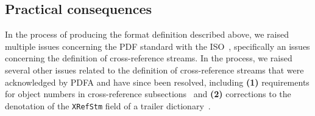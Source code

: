 \subsection{Practical consequences}
\label{sec:consequences}
%
In the process of producing the format definition described above, we
raised multiple issues concerning the PDF standard with the
ISO~\cite{isotc171sc2wg8ISO32000220202020}, specifically an issues
concerning the definition of cross-reference streams.
%
In the process, we raised several other issues related to the
definition of cross-reference streams that were acknowledged by PDFA
and have since been resolved, including %
\textbf{(1)} requirements for object numbers in cross-reference
subsections~\cite{pdfIssue146} and %
\textbf{(2)} corrections to the denotation of the \texttt{XRefStm} field of a trailer dictionary~\cite{pdfIssue147}.

